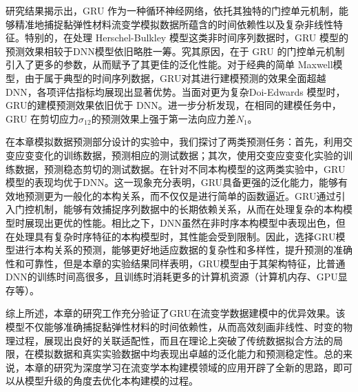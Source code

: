 研究结果揭示出，GRU 作为一种循环神经网络，依托其独特的门控单元机制，能够精准地捕捉黏弹性材料流变学模拟数据所蕴含的时间依赖性以及复杂非线性特征。特别的，在处理 Herschel-Bulkley 模型这类非时间序列数据时，GRU 模型的预测效果相较于DNN模型依旧略胜一筹。究其原因，在于 GRU 的门控单元机制引入了更多的参数，从而赋予了其更佳的泛化性能。对于经典的简单 Maxwell模型，由于属于典型的时间序列数据，GRU对其进行建模预测的效果全面超越DNN，各项评估指标均展现出显著优势。当面对更为复杂Doi-Edwards 模型时，GRU的建模预测效果依旧优于 DNN。进一步分析发现，在相同的建模任务中，GRU 在剪切应力$\sigma_{12}$的预测效果上强于第一法向应力差$N_1$。

在本章模拟数据预测部分设计的实验中，我们探讨了两类预测任务：首先，利用交变应变变化的训练数据，预测相应的测试数据；其次，使用交变应变变化实验的训练数据，预测稳态剪切的测试数据。在针对不同本构模型的这两类实验中，GRU模型的表现均优于DNN。这一现象充分表明，GRU具备更强的泛化能力，能够有效地预测更为一般化的本构关系，而不仅仅是进行简单的函数逼近。GRU通过引入门控机制，能够有效捕捉序列数据中的长期依赖关系，从而在处理复杂的本构模型时展现出更优的性能。相比之下，DNN虽然在非时序本构模型中表现出色，但在处理具有复杂时序特征的本构模型时，其性能会受到限制。因此，选择GRU模型进行本构关系的预测，能够更好地适应数据的复杂性和多样性，提升预测的准确性和可靠性，但是本章的实验结果同样表明，GRU模型由于其架构特征，比普通DNN的训练时间高很多，且训练时消耗更多的计算机资源（计算机内存、GPU显存等）。

综上所述，本章的研究工作充分验证了GRU在流变学数据建模中的优异效果。该模型不仅能够准确捕捉黏弹性材料的时间依赖性，从而高效刻画非线性、时变的物理过程，展现出良好的关联适配性，而且在理论上突破了传统数据拟合方法的局限，在模拟数据和真实实验数据中均表现出卓越的泛化能力和预测稳定性。总的来说，本章的研究为深度学习在流变学本构建模领域的应用开辟了全新的思路，即可以从模型升级的角度去优化本构建模的过程。





